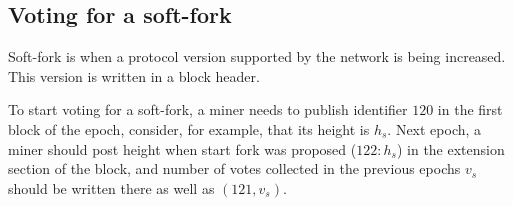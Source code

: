 \subsection{Voting for a soft-fork}

Soft-fork is when a protocol version supported by the network is being increased. This version is written in a block
header.

To start voting for a soft-fork, a miner needs to publish identifier $120$ in the first block of the epoch, consider,
for example, that its height is $h_s$. Next epoch, a miner should post height when start fork was proposed ($122: h_s$)
in the extension section of the block, and number of votes collected in the previous epochs $v_s$ should be written
there as well as $(121, v_s)$.